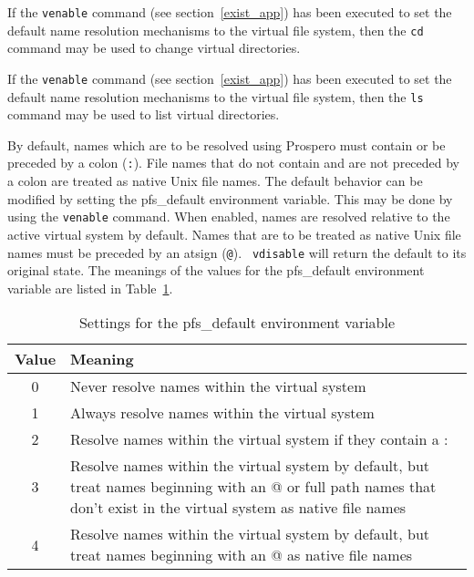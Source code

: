 If the {\tt venable} command (see section~\ref{exist_app}) has been
executed to set the default name resolution mechanisms to the virtual
file system, then the {\tt cd} command may be used to change
virtual directories.

If the {\tt venable} command (see section~\ref{exist_app}) has been
executed to set the default name resolution mechanisms to the virtual
file system, then the {\tt ls} command may be used to list virtual
directories.

By default, names which are to be resolved using Prospero must contain
or be preceded by a colon ({\tt :}).  File names that do not contain
and are not preceded by a colon are treated as native Unix file names.
The default behavior can be modified by setting the {\sc pfs\_default}
environment variable.  This may be done by using the {\tt venable}
command.  When enabled, names are resolved relative to the active
virtual system by default.  Names that are to be treated as native
Unix file names must be preceded by an atsign ({\tt @}).  {\tt
vdisable} will return the default to its original state.  The meanings
of the values for the {\sc pfs\_default} environment variable are
listed in Table~\ref{pfs_default_tab}.

\begin{table}
\begin{center}
\caption{Settings for the {\sc pfs\_default} environment
variable\label{pfs_default_tab}}
\vspace{0.1in}
\begin{tabular}{|c|p{3.9in}|} \hline
Value & Meaning \\ \hline \hline
0 & Never resolve names within the virtual system \\ \hline 
1 & Always resolve names within the virtual system \\ \hline 
2 & Resolve names within the virtual system if they contain a : \\ \hline 
3 & Resolve names within the virtual system by default, but 
treat names beginning with an @ or full path names that 
don't exist in the virtual system as native file names \\ \hline 
4 & Resolve names within the virtual system by default, but 
treat names beginning with an @ as native file names \\ \hline
\end{tabular}
\vspace{-0.1in}
\end{center}
\end{table}


